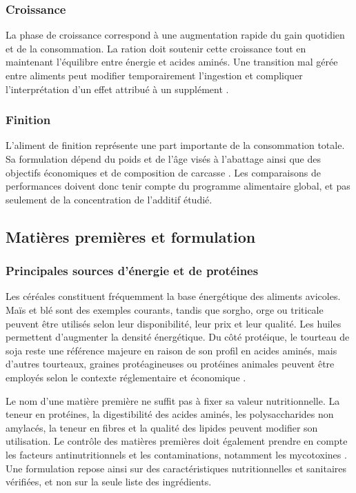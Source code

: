 \subsubsection{Croissance}

La phase de croissance correspond à une augmentation rapide du gain quotidien et de la consommation. La ration doit soutenir cette croissance tout en maintenant l'équilibre entre énergie et acides aminés. Une transition mal gérée entre aliments peut modifier temporairement l'ingestion et compliquer l'interprétation d'un effet attribué à un supplément \citep{Aviagen2025}.

\subsubsection{Finition}

L'aliment de finition représente une part importante de la consommation totale. Sa formulation dépend du poids et de l'âge visés à l'abattage ainsi que des objectifs économiques et de composition de carcasse \citep{Aviagen2025}. Les comparaisons de performances doivent donc tenir compte du programme alimentaire global, et pas seulement de la concentration de l'additif étudié.

\subsection{Matières premières et formulation}

\subsubsection{Principales sources d'énergie et de protéines}

Les céréales constituent fréquemment la base énergétique des aliments avicoles. Maïs et blé sont des exemples courants, tandis que sorgho, orge ou triticale peuvent être utilisés selon leur disponibilité, leur prix et leur qualité. Les huiles permettent d'augmenter la densité énergétique. Du côté protéique, le tourteau de soja reste une référence majeure en raison de son profil en acides aminés, mais d'autres tourteaux, graines protéagineuses ou protéines animales peuvent être employés selon le contexte réglementaire et économique \citep{RavindranAbdollahi2021,Aviagen2022}.

Le nom d'une matière première ne suffit pas à fixer sa valeur nutritionnelle. La teneur en protéines, la digestibilité des acides aminés, les polysaccharides non amylacés, la teneur en fibres et la qualité des lipides peuvent modifier son utilisation. Le contrôle des matières premières doit également prendre en compte les facteurs antinutritionnels et les contaminations, notamment les mycotoxines \citep{Aviagen2025}. Une formulation repose ainsi sur des caractéristiques nutritionnelles et sanitaires vérifiées, et non sur la seule liste des ingrédients.

